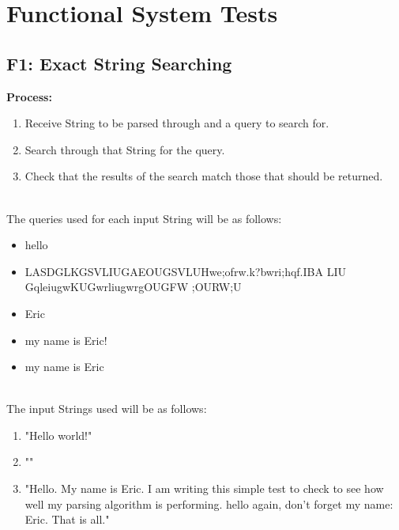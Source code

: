 \documentclass[12pt, titlepage]{article}
\begin{document}
\section{Functional System Tests}
\subsection{F1: Exact String Searching}
\textbf{Process:}
\begin{enumerate}
\item{Receive String to be parsed through and a query to search for.}
\item{Search through that String for the query.}
\item{Check that the results of the search match those that should be returned.}
\end{enumerate}
~\\
The queries used for each input String will be as follows:
\begin{itemize}
\item{hello}
\item{LASDGLKGSVLIUGAEOUGSVLUHwe;ofrw.k?bwri;hqf.IBA LIU GqleiugwKUGwrliugwrgOUGFW	;OURW;U}
\item{Eric}
\item{my name is Eric!}
\item{my name is Eric}
\end{itemize}
~\\
The input Strings used will be as follows:
\begin{enumerate}
\item{"Hello world!"}
\item{""}
\item{"Hello. My name is Eric. I am writing this simple test to check to see how well my parsing algorithm is performing. hello again, don't forget my name: Eric. That is all."}
\end{enumerate}
\end{document}
